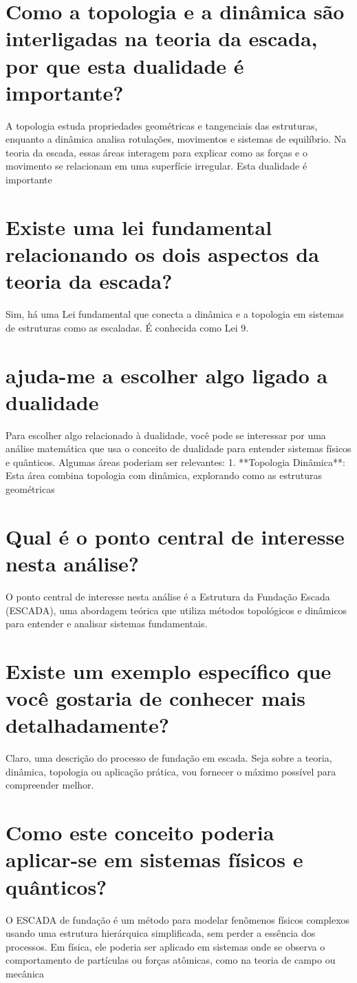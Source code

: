 \documentclass[11pt,a4paper]{article}
\begin{document}
\section{Como a topologia e a dinâmica são interligadas na teoria da escada, por que esta dualidade é importante?}
A topologia estuda propriedades geométricas e tangenciais das estruturas, enquanto a dinâmica analisa rotulações, movimentos e sistemas de equilíbrio. Na teoria da escada, essas áreas interagem para explicar como as forças e o movimento se relacionam em uma superfície irregular. Esta dualidade é importante

\section{Existe uma lei fundamental relacionando os dois aspectos da teoria da escada?}
Sim, há uma Lei fundamental que conecta a dinâmica e a topologia em sistemas de estruturas como as escaladas. É conhecida como Lei 9.

\section{ajuda-me a escolher algo ligado a dualidade}
Para escolher algo relacionado à dualidade, você pode se interessar por uma análise matemática que usa o conceito de dualidade para entender sistemas físicos e quânticos. Algumas áreas poderiam ser relevantes: 1. **Topologia Dinâmica**: Esta área combina topologia com dinâmica, explorando como as estruturas geométricas

\section{Qual é o ponto central de interesse nesta análise?}
O ponto central de interesse nesta análise é a Estrutura da Fundação Escada (ESCADA), uma abordagem teórica que utiliza métodos topológicos e dinâmicos para entender e analisar sistemas fundamentais.

\section{Existe um exemplo específico que você gostaria de conhecer mais detalhadamente?}
Claro, uma descrição do processo de fundação em escada. Seja sobre a teoria, dinâmica, topologia ou aplicação prática, vou fornecer o máximo possível para compreender melhor.

\section{Como este conceito poderia aplicar-se em sistemas físicos e quânticos?}
O ESCADA de fundação é um método para modelar fenômenos físicos complexos usando uma estrutura hierárquica simplificada, sem perder a essência dos processos. Em física, ele poderia ser aplicado em sistemas onde se observa o comportamento de partículas ou forças atômicas, como na teoria de campo ou mecânica
\end{document}
